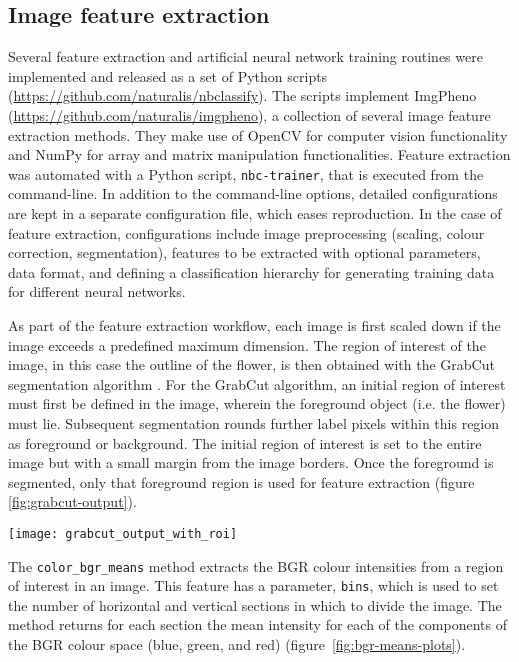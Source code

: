 \documentclass[3p,twocolumn,10pt]{elsarticle}
\begin{document}
\subsection{Image feature extraction}

Several feature extraction and artificial neural network training routines were implemented and released as a set of Python scripts (\url{https://github.com/naturalis/nbclassify}). The scripts implement ImgPheno (\url{https://github.com/naturalis/imgpheno}), a collection of several image feature extraction methods. They make use of OpenCV \citep{Pulli2012} for computer vision functionality and NumPy \citep{VanderWalt2011} for array and matrix manipulation functionalities. Feature extraction was automated with a Python script, \texttt{nbc-trainer}, that is executed from the command-line. In addition to the command-line options, detailed configurations are kept in a separate configuration file, which eases reproduction. In the case of feature extraction, configurations include image preprocessing (scaling, colour correction, segmentation), features to be extracted with optional parameters, data format, and defining a classification hierarchy for generating training data for different neural networks.

As part of the feature extraction workflow, each image is first scaled down if the image exceeds a predefined maximum dimension. The region of interest of the image, in this case the outline of the flower, is then obtained with the GrabCut segmentation algorithm \citep{Rother2004}. For the GrabCut algorithm, an initial region of interest must first be defined in the image, wherein the foreground object (i.e. the flower) must lie. Subsequent segmentation rounds further label pixels within this region as foreground or background. The initial region of interest is set to the entire image but with a small margin from the image borders. Once the foreground is segmented, only that foreground region is used for feature extraction (figure \ref{fig:grabcut-output}).

\begin{figure*}[h]
    \centering
    \texttt{[image: grabcut\_output\_with\_roi]}
    \caption{Foreground segmentation with GrabCut.}
    \label{fig:grabcut-output}
\end{figure*}

The \verb/color_bgr_means/ method extracts the BGR colour intensities from a region of interest in an image. This feature has a parameter, \verb/bins/, which is used to set the number of horizontal and vertical sections in which to divide the image. The method returns for each section the mean intensity for each of the components of the BGR colour space (blue, green, and red) (figure~\ref{fig:bgr-means-plots}).
\end{document}
